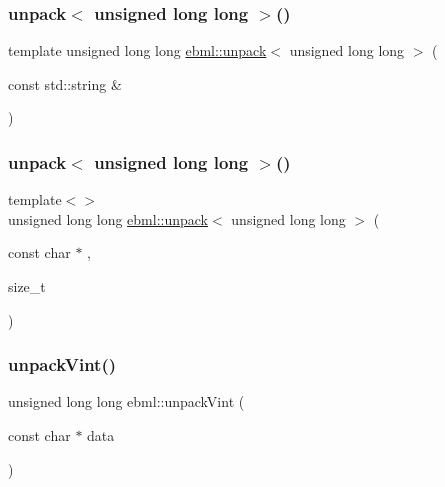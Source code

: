 \subsubsection{\texorpdfstring{unpack$<$ unsigned long long $>$()}{unpack< unsigned long long >()}\hspace{0.1cm}{\footnotesize\ttfamily [1/2]}}
{\footnotesize\ttfamily template unsigned long long \mbox{\hyperlink{namespaceebml_a55a0f9d0c93e80d488021fd03c4f3861}{ebml\+::unpack}}$<$ unsigned long long $>$ (\begin{DoxyParamCaption}\item[{const std\+::string \&}]{ }\end{DoxyParamCaption})}

\mbox{\label{namespaceebml_a9631ff473950f82b6cb6302b2126d277}} 
\subsubsection{\texorpdfstring{unpack$<$ unsigned long long $>$()}{unpack< unsigned long long >()}\hspace{0.1cm}{\footnotesize\ttfamily [2/2]}}
{\footnotesize\ttfamily template$<$$>$ \\
unsigned long long \mbox{\hyperlink{namespaceebml_a55a0f9d0c93e80d488021fd03c4f3861}{ebml\+::unpack}}$<$ unsigned long long $>$ (\begin{DoxyParamCaption}\item[{const char $\ast$}]{,  }\item[{size\+\_\+t}]{ }\end{DoxyParamCaption})}

\mbox{\label{namespaceebml_a7928e2829b2feaf2516b0b019b28bf65}} 
\subsubsection{\texorpdfstring{unpack\+Vint()}{unpackVint()}\hspace{0.1cm}{\footnotesize\ttfamily [1/4]}}
{\footnotesize\ttfamily unsigned long long ebml\+::unpack\+Vint (\begin{DoxyParamCaption}\item[{const char $\ast$}]{data }\end{DoxyParamCaption})}

